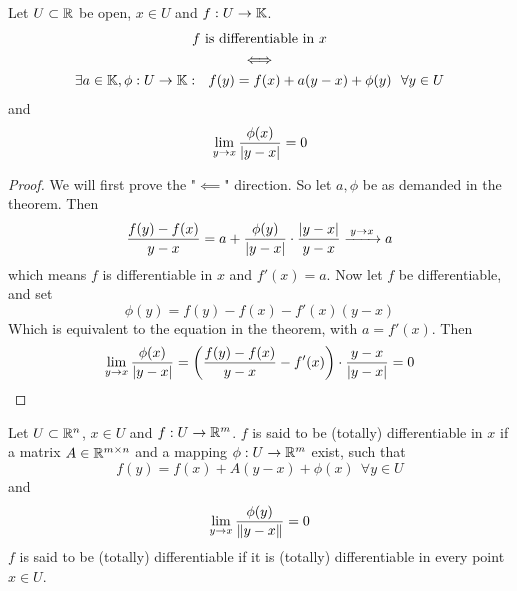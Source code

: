 \documentclass[../../script.tex]{subfiles}
\begin{document}
\begin{thm}
    Let $U \subset \mathbb{R}$ be open, $x \in U$ and $f: U \rightarrow \mathbb{K}$.
    \begin{gather*}
        f \text{ is differentiable in } x \\
        \iff \\
        \exists a \in \mathbb{K}, \phi: U \rightarrow \mathbb{K}: ~~f(y) = f(x) + a(y - x) + \phi(y) ~~\forall y \in U
    \end{gather*}
    and 
    \[
        \lim_{y \rightarrow x} \frac{\phi(x)}{\abs{y - x}} = 0
    \]
\end{thm}
\begin{proof}
    We will first prove the "$\impliedby$" direction. So let $a, \phi$ be as demanded in the theorem. Then 
    \begin{equation}
        \frac{f(y) - f(x)}{y - x} = a + \frac{\phi(y)}{\abs{y - x}} \cdot \frac{\abs{y - x}}{y - x} \conv{y \rightarrow x} a
    \end{equation}
    which means $f$ is differentiable in $x$ and $f'(x) = a$. Now let $f$ be differentiable, and set
    \begin{equation}
        \phi(y) = f(y) - f(x) - f'(x)(y - x)
    \end{equation}
    Which is equivalent to the equation in the theorem, with $a = f'(x)$. Then
    \begin{equation}
        \lim_{y \rightarrow x} \frac{\phi(x)}{\abs{y - x}} = \left( \frac{f(y) - f(x)}{y - x} - f'(x) \right) \cdot \frac{y - x}{\abs{y - x}} = 0
    \end{equation}
\end{proof}

\begin{defi}
    Let $U \subset \mathbb{R}^n$, $x \in U$ and $f: U \rightarrow \mathbb{R}^m$.
    $f$ is said to be (totally) differentiable in $x$ if a matrix $A \in \mathbb{R}^{m \times n}$ and a mapping $\phi: U \rightarrow \mathbb{R}^m$ exist, such that
    \[
        f(y) = f(x) + A(y - x) + \phi(x) ~~\forall y \in U
    \]
    and 
    \[
        \lim_{y \rightarrow x} \frac{\phi(y)}{\norm{y - x}} = 0
    \]
    $f$ is said to be (totally) differentiable if it is (totally) differentiable in every point $x \in U$.
\end{defi}
\end{document}
